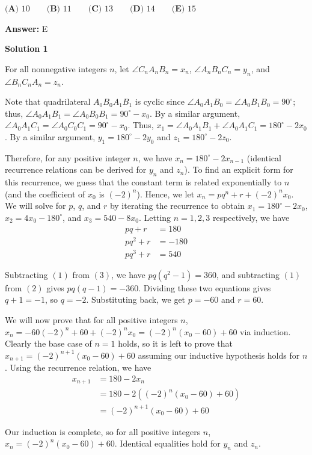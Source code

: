 \begin{enumerate}
 $\textbf{(A) } 10 \qquad \textbf{(B) }11 \qquad \textbf{(C) } 13\qquad \textbf{(D) } 14 \qquad \textbf{(E) } 15$

 \textbf{Answer: }E



\textbf{Solution 1}

For all nonnegative integers $n$, let $\angle C_nA_nB_n=x_n$, $\angle A_nB_nC_n=y_n$, and $\angle B_nC_nA_n=z_n$.

 Note that quadrilateral $A_0B_0A_1B_1$ is cyclic since $\angle A_0A_1B_0=\angle A_0B_1B_0=90^\circ$; thus, $\angle A_0A_1B_1=\angle A_0B_0B_1=90^\circ-x_0$. By a similar argument, $\angle A_0A_1C_1=\angle A_0C_0C_1=90^\circ-x_0$. Thus, $x_1=\angle A_0A_1B_1+\angle A_0A_1C_1=180^\circ-2x_0$. By a similar argument, $y_1=180^\circ-2y_0$ and $z_1=180^\circ-2z_0$.

 Therefore, for any positive integer $n$, we have $x_n=180^\circ-2x_{n-1}$ (identical recurrence relations can be derived for $y_n$ and $z_n$). To find an explicit form for this recurrence, we guess that the constant term is related exponentially to $n$ (and the coefficient of $x_0$ is $(-2)^n$). Hence, we let $x_n=pq^n+r+(-2)^nx_0$. We will solve for $p$, $q$, and $r$ by iterating the recurrence to obtain $x_1=180^\circ-2x_0$, $x_2=4x_0-180^\circ$, and $x_3=540-8x_0$. Letting $n=1,2,3$ respectively, we have 
 \begin{align} pq+r&=180 \\ pq^2+r&=-180 \\ pq^3+r&=540 \end{align}

 Subtracting $(1)$ from $(3)$, we have $pq(q^2-1)=360$, and subtracting $(1)$ from $(2)$ gives $pq(q-1)=-360$. Dividing these two equations gives $q+1=-1$, so $q=-2$. Substituting back, we get $p=-60$ and $r=60$.

 We will now prove that for all positive integers $n$, $x_n=-60(-2)^n+60+(-2)^nx_0=(-2)^n(x_0-60)+60$ via induction. Clearly the base case of $n=1$ holds, so it is left to prove that $x_{n+1}=(-2)^{n+1}(x_0-60)+60$ assuming our inductive hypothesis holds for $n$. Using the recurrence relation, we have 
 \begin{align*} x_{n+1}&=180-2x_n \\ &=180-2((-2)^n(x_0-60)+60) \\ &=(-2)^{n+1}(x_0-60)+60 \end{align*}


 Our induction is complete, so for all positive integers $n$, $x_n=(-2)^n(x_0-60)+60$. Identical equalities hold for $y_n$ and $z_n$.


\end{enumerate}

